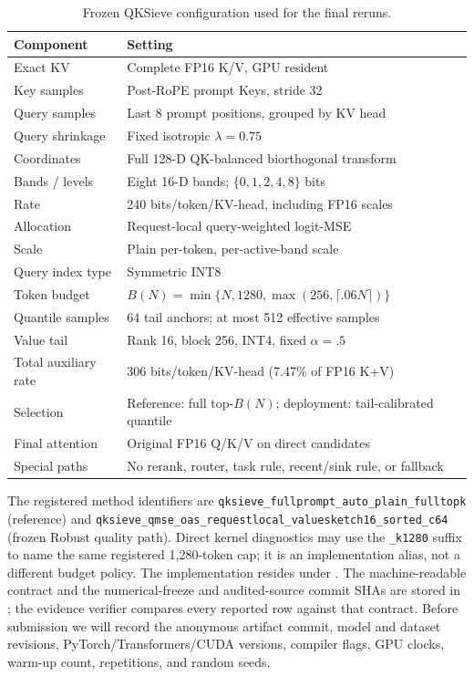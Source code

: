 \begin{table}[h]
\caption{Frozen QKSieve configuration used for the final reruns.}
\centering
\begin{tabular}{ll}
\toprule
Component & Setting \\
\midrule
Exact KV & Complete FP16 K/V, GPU resident \\
Key samples & Post-RoPE prompt Keys, stride 32 \\
Query samples & Last 8 prompt positions, grouped by KV head \\
Query shrinkage & Fixed isotropic $\lambda=0.75$ \\
Coordinates & Full 128-D QK-balanced biorthogonal transform \\
Bands / levels & Eight 16-D bands; $\{0,1,2,4,8\}$ bits \\
Rate & 240 bits/token/KV-head, including FP16 scales \\
Allocation & Request-local query-weighted logit-MSE \\
Scale & Plain per-token, per-active-band scale \\
Query index type & Symmetric INT8 \\
Token budget & $B(N)=\min\{N,1280,\max(256,\lceil.06N\rceil)\}$ \\
Quantile samples & 64 tail anchors; at most 512 effective samples \\
Value tail & Rank 16, block 256, INT4, fixed $\alpha=.5$ \\
Total auxiliary rate & 306 bits/token/KV-head (7.47\% of FP16 K+V) \\
Selection & Reference: full top-$B(N)$; deployment: tail-calibrated quantile \\
Final attention & Original FP16 Q/K/V on direct candidates \\
Special paths & No rerank, router, task rule, recent/sink rule, or fallback \\
\bottomrule
\end{tabular}
\end{table}

The registered method identifiers are
\texttt{qksieve\_fullprompt\_auto\_plain\_fulltopk} (reference) and
\texttt{qksieve\_qmse\_oas\_requestlocal\_valuesketch16\_sorted\_c64}
(frozen Robust quality path).  Direct kernel diagnostics may use the
\texttt{\_k1280} suffix to name the same registered 1,280-token cap; it is
an implementation alias, not a different budget policy.
The implementation resides under
.
The machine-readable contract and the numerical-freeze and audited-source
commit SHAs are stored in
; the evidence
verifier compares every reported row against that contract.
Before submission we will record the anonymous artifact commit, model and
dataset revisions, PyTorch/Transformers/CUDA versions, compiler flags, GPU
clocks, warm-up count, repetitions, and random seeds.

